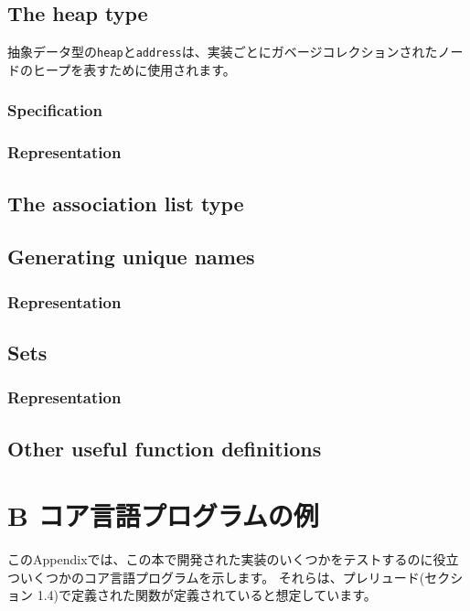 \documentclass{jarticle}
\begin{document}
\subsection{The heap type}

抽象データ型の\texttt{heap}と\texttt{address}は、実装ごとにガベージコレクションされたノードのヒープを表すために使用されます。

\subsubsection{Specification}
\subsubsection{Representation}
\newpage

\subsection{The association list type}

\subsection{Generating unique names}
\subsubsection{Representation}
\newpage

\subsection{Sets}
\subsubsection{Representation}
\newpage

\subsection{Other useful function definitions}
\newpage

\section{B コア言語プログラムの例}

このAppendixでは、この本で開発された実装のいくつかをテストするのに役立ついくつかのコア言語プログラムを示します。
それらは、プレリュード(セクション 1.4)で定義された関数が定義されていると想定しています。
\end{document}
